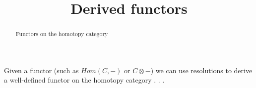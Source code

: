 \documentclass{ximera}
\title{Derived functors}
\begin{document}
\begin{abstract}
  Functors on the homotopy category
\end{abstract}
\maketitle

Given a functor (such as $Hom(C,-)$ or $C \otimes -$) we can use
resolutions to derive a well-defined functor on the homotopy
category . . .
\end{document}
